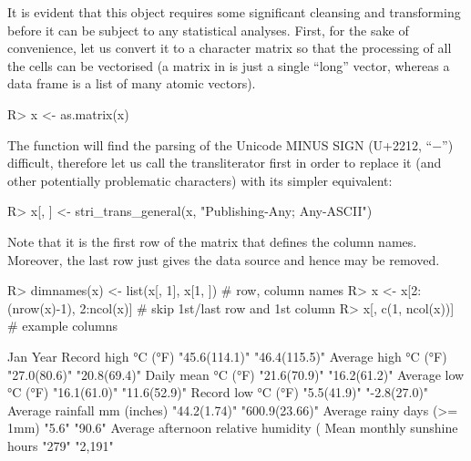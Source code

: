 \documentclass[nojss]{jss}\usepackage[]{graphicx}\usepackage[]{color}
\begin{document}
It is evident that this object requires some significant
cleansing and transforming before it can be subject
to any statistical analyses.
First, for the sake of convenience, let us convert it
to a character matrix so that the processing of all the cells can
be vectorised
(a matrix in  is just a single ``long'' vector,
whereas a data frame is a list of many atomic vectors).

\begin{Schunk}
\begin{Sinput}
R> x <- as.matrix(x)
\end{Sinput}
\end{Schunk}

The  function will find the parsing of
the Unicode MINUS SIGN (U+2212, ``−'') difficult,
therefore let us call the transliterator first in order to replace it
(and other potentially problematic characters) with its simpler equivalent:

\begin{Schunk}
\begin{Sinput}
R> x[, ] <- stri_trans_general(x, "Publishing-Any; Any-ASCII")
\end{Sinput}
\end{Schunk}

Note that it is the first row of the matrix that defines the column names.
Moreover, the last row just gives the data source and hence may be removed.

\begin{Schunk}
\begin{Sinput}
R> dimnames(x) <- list(x[, 1], x[1, ])  # row, column names
R> x <- x[2:(nrow(x)-1), 2:ncol(x)]     # skip 1st/last row and 1st column
R> x[, c(1, ncol(x))]  # example columns
\end{Sinput}
\begin{Soutput}
                                        Jan           Year
Record high °C (°F)                     "45.6(114.1)" "46.4(115.5)"
Average high °C (°F)                    "27.0(80.6)"  "20.8(69.4)"
Daily mean °C (°F)                      "21.6(70.9)"  "16.2(61.2)"
Average low °C (°F)                     "16.1(61.0)"  "11.6(52.9)"
Record low °C (°F)                      "5.5(41.9)"   "-2.8(27.0)"
Average rainfall mm (inches)            "44.2(1.74)"  "600.9(23.66)"
Average rainy days (>= 1mm)             "5.6"         "90.6"
Average afternoon relative humidity (%) "47"          "51"
Mean monthly sunshine hours             "279"         "2,191"
\end{Soutput}
\end{Schunk}
\end{document}
